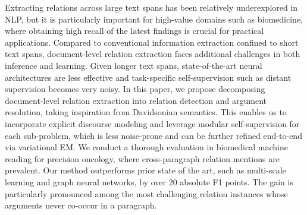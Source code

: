 Extracting relations across large text spans has been relatively underexplored in NLP, but it is particularly important for high-value domains such as biomedicine, where obtaining high recall of the latest findings is crucial for practical applications. Compared to conventional information extraction confined to short text spans, document-level relation extraction faces additional challenges in both inference and learning. Given longer text spans, state-of-the-art neural architectures are less effective and task-specific self-supervision such as distant supervision becomes very noisy. In this paper, we propose decomposing document-level relation extraction into relation detection and argument resolution, taking inspiration from Davidsonian semantics. This enables us to incorporate explicit discourse modeling and leverage modular self-supervision for each sub-problem, which is less noise-prone and can be further refined end-to-end via variational EM. We conduct a thorough evaluation in biomedical machine reading for precision oncology, where cross-paragraph relation mentions are prevalent. Our method outperforms prior state of the art, such as multi-scale learning and graph neural networks, by over 20 absolute F1 points. The gain is particularly pronounced among the most challenging relation instances whose arguments never co-occur in a paragraph.
